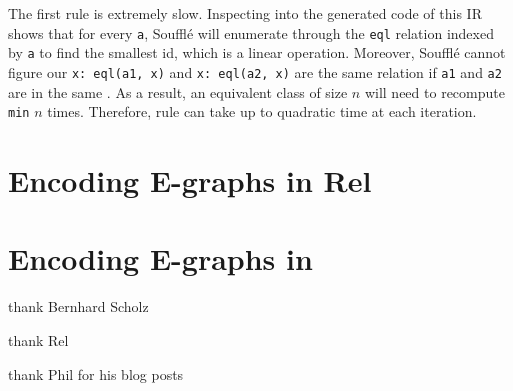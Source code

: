 The first rule is extremely slow.
Inspecting into the generated code of this IR
 shows that for every \verb|a|, 
 Souffl\'e will enumerate through the \verb|eql| relation indexed by \verb|a|
 to find the smallest id,
 which is a linear operation.
Moreover,
 Souffl\'e cannot figure our \verb|x: eql(a1, x)| and \verb|x: eql(a2, x)| 
 are the same relation if \verb|a1| and \verb|a2| are in the same \eclass.
As a result,
 an equivalent class of size $n$ will need to recompute \verb|min| $n$ times.
Therefore, rule can take up to quadratic time at each iteration.


\section{Encoding E-graphs in Rel}\label{section/rel}

\section{Encoding E-graphs in }

thank Bernhard Scholz

thank Rel

thank Phil for his blog posts
